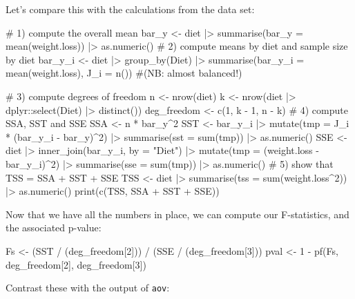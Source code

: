 \documentclass[
  letterpaper,
  DIV=11,
  numbers=noendperiod]{scrreprt}
\newenvironment{Shaded}{\begin{snugshade}}{\end{snugshade}}
\newcommand{\NormalTok}[1]{\textcolor[rgb]{0.00,0.23,0.31}{#1}}
\begin{document}
Let's compare this with the calculations from the data set:

\begin{Shaded}
\begin{Highlighting}[]
\NormalTok{\# 1) compute the overall mean}
\NormalTok{bar\_y \textless{}{-} diet |\textgreater{} }
\NormalTok{  summarise(bar\_y = mean(weight.loss)) |\textgreater{} }
\NormalTok{  as.numeric()}
\NormalTok{\# 2) compute means by diet and sample size by diet}
\NormalTok{bar\_y\_i \textless{}{-} diet |\textgreater{} }
\NormalTok{  group\_by(Diet) |\textgreater{} }
\NormalTok{  summarise(bar\_y\_i = mean(weight.loss),}
\NormalTok{            J\_i = n())}
\NormalTok{\#(NB: almost balanced!)}

\NormalTok{\# 3) compute degrees of freedom}
\NormalTok{n \textless{}{-} nrow(diet)}
\NormalTok{k \textless{}{-} nrow(diet |\textgreater{} dplyr::select(Diet) |\textgreater{} distinct())}
\NormalTok{deg\_freedom \textless{}{-} c(1, k {-} 1, n {-} k)}
\NormalTok{\# 4) compute SSA, SST and SSE}
\NormalTok{SSA \textless{}{-} n * bar\_y\^{}2}
\NormalTok{SST \textless{}{-} bar\_y\_i |\textgreater{} }
\NormalTok{  mutate(tmp = J\_i * (bar\_y\_i {-} bar\_y)\^{}2) |\textgreater{} }
\NormalTok{  summarise(sst = sum(tmp)) |\textgreater{} }
\NormalTok{  as.numeric()}
\NormalTok{SSE \textless{}{-} diet |\textgreater{} }
\NormalTok{  inner\_join(bar\_y\_i, by = "Diet") |\textgreater{} }
\NormalTok{  mutate(tmp = (weight.loss {-} bar\_y\_i)\^{}2) |\textgreater{} }
\NormalTok{  summarise(sse = sum(tmp)) |\textgreater{} }
\NormalTok{  as.numeric()}
\NormalTok{\# 5) show that TSS = SSA + SST + SSE}
\NormalTok{TSS \textless{}{-} diet |\textgreater{} }
\NormalTok{  summarise(tss = sum(weight.loss\^{}2)) |\textgreater{} }
\NormalTok{  as.numeric()}
\NormalTok{print(c(TSS, SSA + SST + SSE))}
\end{Highlighting}
\end{Shaded}

Now that we have all the numbers in place, we can compute our
F-statistics, and the associated p-value:

\begin{Shaded}
\begin{Highlighting}[]
\NormalTok{Fs \textless{}{-} (SST / (deg\_freedom[2])) / (SSE / (deg\_freedom[3]))}
\NormalTok{pval \textless{}{-} 1 {-} pf(Fs, deg\_freedom[2], deg\_freedom[3])}
\end{Highlighting}
\end{Shaded}

Contrast these with the output of \texttt{aov}:
\end{document}

